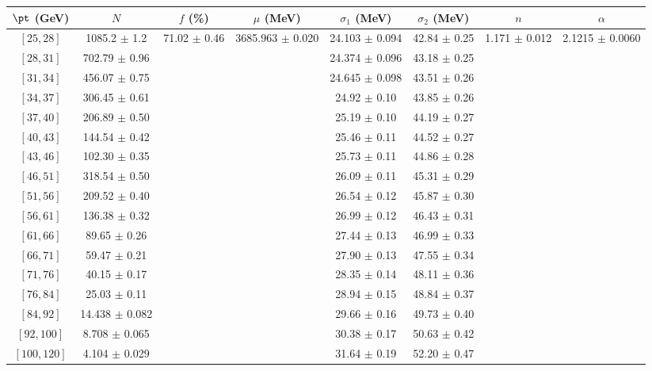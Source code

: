 \begin{tabular}{c||c|c|c|c|c|c|c}
$\pt$ (GeV) & $N$ & $f$ (\%) & $\mu$ (MeV) & $\sigma_1$ (MeV) & $\sigma_2$ (MeV) & $n$ & $\alpha$ \\
\hline
$[25, 28]$ & 1085.2 $\pm$ 1.2 & \multirow{17}{*}{71.02 $\pm$ 0.46} & \multirow{17}{*}{3685.963 $\pm$ 0.020} & 24.103 $\pm$ 0.094 & 42.84 $\pm$ 0.25 & \multirow{17}{*}{1.171 $\pm$ 0.012} & \multirow{17}{*}{2.1215 $\pm$ 0.0060}\\
$[28, 31]$ & 702.79 $\pm$ 0.96 &  &  & 24.374 $\pm$ 0.096 & 43.18 $\pm$ 0.25 &  & \\
$[31, 34]$ & 456.07 $\pm$ 0.75 &  &  & 24.645 $\pm$ 0.098 & 43.51 $\pm$ 0.26 &  & \\
$[34, 37]$ & 306.45 $\pm$ 0.61 &  &  & 24.92 $\pm$ 0.10 & 43.85 $\pm$ 0.26 &  & \\
$[37, 40]$ & 206.89 $\pm$ 0.50 &  &  & 25.19 $\pm$ 0.10 & 44.19 $\pm$ 0.27 &  & \\
$[40, 43]$ & 144.54 $\pm$ 0.42 &  &  & 25.46 $\pm$ 0.11 & 44.52 $\pm$ 0.27 &  & \\
$[43, 46]$ & 102.30 $\pm$ 0.35 &  &  & 25.73 $\pm$ 0.11 & 44.86 $\pm$ 0.28 &  & \\
$[46, 51]$ & 318.54 $\pm$ 0.50 &  &  & 26.09 $\pm$ 0.11 & 45.31 $\pm$ 0.29 &  & \\
$[51, 56]$ & 209.52 $\pm$ 0.40 &  &  & 26.54 $\pm$ 0.12 & 45.87 $\pm$ 0.30 &  & \\
$[56, 61]$ & 136.38 $\pm$ 0.32 &  &  & 26.99 $\pm$ 0.12 & 46.43 $\pm$ 0.31 &  & \\
$[61, 66]$ & 89.65 $\pm$ 0.26 &  &  & 27.44 $\pm$ 0.13 & 46.99 $\pm$ 0.33 &  & \\
$[66, 71]$ & 59.47 $\pm$ 0.21 &  &  & 27.90 $\pm$ 0.13 & 47.55 $\pm$ 0.34 &  & \\
$[71, 76]$ & 40.15 $\pm$ 0.17 &  &  & 28.35 $\pm$ 0.14 & 48.11 $\pm$ 0.36 &  & \\
$[76, 84]$ & 25.03 $\pm$ 0.11 &  &  & 28.94 $\pm$ 0.15 & 48.84 $\pm$ 0.37 &  & \\
$[84, 92]$ & 14.438 $\pm$ 0.082 &  &  & 29.66 $\pm$ 0.16 & 49.73 $\pm$ 0.40 &  & \\
$[92, 100]$ & 8.708 $\pm$ 0.065 &  &  & 30.38 $\pm$ 0.17 & 50.63 $\pm$ 0.42 &  & \\
$[100, 120]$ & 4.104 $\pm$ 0.029 &  &  & 31.64 $\pm$ 0.19 & 52.20 $\pm$ 0.47 &  & \\
\end{tabular}
